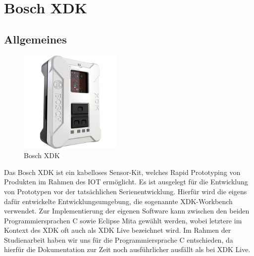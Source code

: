 \section{Bosch \acf{XDK}}\label{sec:Bosch XDK}
\subsection{Allgemeines}\label{subsec:Allgemeines}
\begin{figure}[H]
	\centering
	\includegraphics[width=5cm]{images/xdk.jpg}	
	\caption{Bosch \acs*{XDK}}
	\label{fig:XDK}
\end{figure}
Das Bosch \acf{XDK} ist ein kabelloses Sensor-Kit, welches Rapid Prototyping von Produkten im Rahmen des \acf{IOT} ermöglicht. Es ist ausgelegt für die Entwicklung von Prototypen vor der tatsächlichen Serienentwicklung. 
Hierfür wird die eigens dafür entwickelte Entwicklungsumgebung, die sogenannte XDK-Workbench verwendet. Zur Implementierung der eigenen Software kann zwischen den beiden Programmiersprachen C sowie Eclipse Mita gewählt werden, wobei letztere im Kontext des XDK oft auch als XDK Live bezeichnet wird. Im Rahmen der Studienarbeit haben wir uns für die Programmiersprache C entschieden, da hierfür die Dokumentation zur Zeit noch ausführlicher ausfällt als bei XDK Live.\newline
~\cite{XDK.General}
